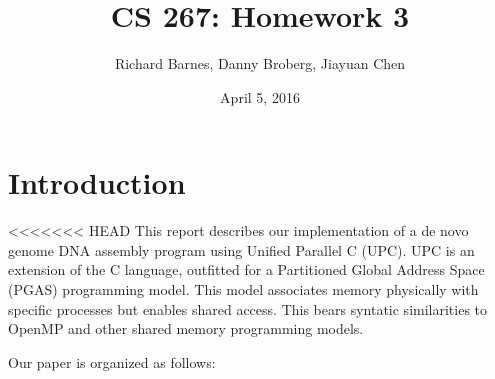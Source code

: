 \documentclass{article}
\title{CS 267: Homework 3}
\author{Richard Barnes, Danny Broberg, Jiayuan Chen}
\date{April 5, 2016}
\begin{document}
\maketitle

\section{Introduction}
<<<<<<< HEAD
This report describes our implementation of a de novo genome DNA assembly program using Unified Parallel C (UPC). UPC is an extension of the C language, outfitted for a Partitioned Global Address Space (PGAS) programming model. This model associates memory physically with specific processes but enables shared access. This bears syntatic similarities to OpenMP and other shared memory programming models.

Our paper is organized as follows:
\end{document}
